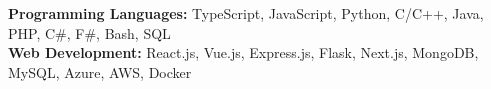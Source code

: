 \vspace{5pt}\item{
    \textbf{Programming Languages:} 
    TypeScript,
    JavaScript,
    Python,
    C/C++,
    Java,
    PHP,
    C\#,
    F\#,
    Bash,
    SQL \\
    
    \textbf{Web Development:} 
    React.js,
    Vue.js,
    Express.js,
    Flask,
    Next.js,
    MongoDB,
    MySQL,
    Azure,
    AWS,
    Docker
}
